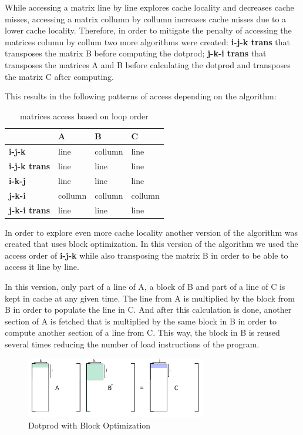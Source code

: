 \documentclass[a4paper]{report}
\begin{document}
While accessing a matrix line by line explores cache locality and decreases
cache misses, accessing a matrix collumn by collumn increases cache misses due
to a lower cache locality. Therefore, in order to mitigate the penalty of
accessing the matrices column by collum two more algorithms were created:
\textbf{i-j-k trans} that transposes the matrix B before computing the
dotprod; \textbf{j-k-i trans} that transposes the matrices A and B before
calculating the dotprod and transposes the matrix C after computing.

This results in the following patterns of access depending on the algorithm:

\begin{table}[H]
\centering
\begin{tabular}{|l|l|l|l|}
\hline
                     & A       & B       & C       \\ \hline
\textbf{i-j-k}       & line    & collumn & line    \\ \hline
\textbf{i-j-k trans} & line    & line    & line    \\ \hline
\textbf{i-k-j}       & line    & line    & line    \\ \hline
\textbf{j-k-i}       & collumn & collumn & collumn \\ \hline
\textbf{j-k-i trans} & line    & line    & line    \\ \hline
\end{tabular}
\caption{matrices access based on loop order}
\end{table}

In order to explore even more cache locality another version of the algorithm
was created that uses block optimization. In this version of the algorithm we
used the access order of \textbf{i-j-k} while also transposing the matrix B in
order to be able to access it line by line.

In this version, only part of a line of A, a block of B and part of a line of C
is kept in cache at any given time. The line from A is multiplied by the block
from B in order to populate the line in C. And after this calculation is done,
another section of A is fetched that is multiplied by the same block in B
in order to compute another section of a line from C. This way, the block in B
is reused several times reducing the number of load instructions of the program.

\begin{figure}[H]
    \centering
        \includegraphics[width=0.7\textwidth]{images/matrix_mult_block.png}
        \caption{Dotprod with Block Optimization}
\end{figure}
\end{document}
